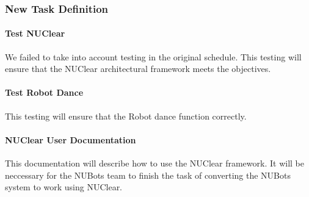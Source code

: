 \documentclass[a4paper]{article}
\begin{document}
			\subsubsection{New Task Definition}
				\paragraph{Test NUClear}
					We failed to take into account testing in the original schedule. This testing will ensure that the NUClear architectural framework meets the objectives.
				\paragraph{Test Robot Dance}
					This testing will ensure that the Robot dance function correctly.
				\paragraph{NUClear User Documentation}
					This documentation will describe how to use the NUClear framework. It will be neccessary for the NUBots team to finish the task of converting the NUBots system to work using NUClear.
					
\end{document}
